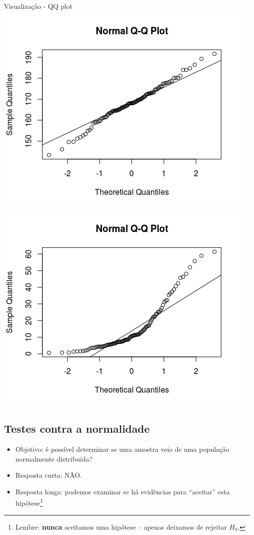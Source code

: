\documentclass{beamer}
\begin{document}
\begin{frame}{Visualização - QQ plot}
  \includegraphics[height=.5\textheight]{Cap37-38/normal-qq}
  \includegraphics[height=.5\textheight]{Cap37-38/lognormal-qq}
\end{frame}

\subsection[Normalidade]{Testes contra a normalidade}

\begin{frame}
  \begin{itemize}
  \item Objetivo: é possível \alert{determinar} se uma amostra veio de uma população normalmente distribuída?
  \item<2-> Resposta curta: \alert<3->{NÃO}.
    \bigskip
    \bigskip
  \item<4-> Resposta longa: podemos examinar se há evidências para ``aceitar'' esta hipótese\footnote{\scriptsize Lembre: {\bf nunca} aceitamos uma hipótese -- apenas deixamos de rejeitar $H_0$.}
  \end{itemize}
\end{frame}
\end{document}
